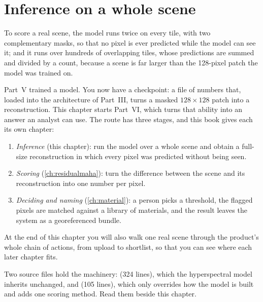 \chapter{Inference on a whole scene}\label{ch:inference}

\begin{onething}
To score a real scene, the model runs twice on every tile, with two complementary masks, so that no pixel
is ever predicted while the model can see it; and it runs over hundreds of overlapping tiles, whose
predictions are summed and divided by a count, because a scene is far larger than the 128-pixel patch the
model was trained on.
\end{onething}

Part~V trained a model. You now have a checkpoint: a file of numbers that, loaded into the architecture of
Part~III, turns a masked $128\times128$ patch into a reconstruction. This chapter starts Part~VI, which turns
that ability into an answer an analyst can use. The route has three stages, and this book gives each its
own chapter:
\begin{enumerate}
\item \emph{Inference} (this chapter): run the model over a whole scene and obtain a full-size
  reconstruction in which every pixel was predicted without being seen.
\item \emph{Scoring} (\cref{ch:residualmaha}): turn the difference between the scene and its reconstruction
  into one number per pixel.
\item \emph{Deciding and naming} (\cref{ch:material}): a person picks a threshold, the flagged pixels are
  matched against a library of materials, and the result leaves the system as a georeferenced bundle.
\end{enumerate}
At the end of this chapter you will also walk one real scene through the product's whole chain of actions,
from upload to shortlist, so that you can see where each later chapter fits.

\begin{sloppypar}
Two source files hold the machinery: 
(324 lines), which the hyperspectral model inherits unchanged, and
 (105 lines), which
only overrides how the model is built and adds one scoring method. Read them beside this chapter.
\end{sloppypar}

